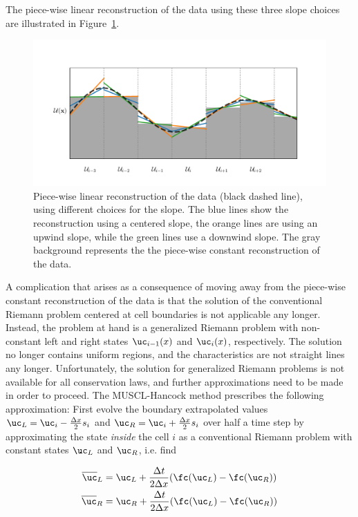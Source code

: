The piece-wise linear reconstruction of the data using these three slope choices are illustrated in
Figure~\ref{fig:piecewise-linear}.



\begin{figure}
    \centering
    \includegraphics[width=\textwidth]{figures/FV/piecewise_linear.pdf}%
    \caption[Piece-wise linear reconstruction of data]{
Piece-wise linear reconstruction of the data (black dashed line), using different choices for the
slope. The blue lines show the reconstruction using a centered slope, the orange lines are using an
upwind slope, while the green lines use a downwind slope. The gray background represents the the
piece-wise constant reconstruction of the data.
    }
    \label{fig:piecewise-linear}
\end{figure}


A complication that arises as a consequence of moving away from the piece-wise constant
reconstruction of the data is that the solution of the conventional Riemann problem centered at cell
boundaries is not applicable any longer. Instead, the problem at hand is a generalized Riemann
problem with non-constant left and right states $\uc_{i-1}(x)$ and $\uc_{i}(x)$, respectively.
The solution no longer contains uniform regions, and the characteristics are not straight lines any
longer. Unfortunately, the solution for generalized Riemann problems is not available for all
conservation laws, and further approximations need to be made in order to proceed. The
MUSCL-Hancock method prescribes the following approximation: First evolve the boundary extrapolated
values $\uc_L = \uc_i - \frac{\Delta x}{2} s_i$ and $\uc_R = \uc_i + \frac{\Delta x}{2} s_i$ over
half a time step by approximating the state \emph{inside} the cell $i$ as a conventional Riemann
problem with constant states $\uc_L$ and $\uc_R$, i.e. find

\begin{align}
    \overline{\uc}_L &= \uc_L + \frac{\Delta t}{2 \Delta x} (\fc(\uc_L) - \fc(\uc_R))
\label{eq:boundary-extrapolated-L}\\
    \overline{\uc}_R &= \uc_R + \frac{\Delta t}{2 \Delta x} (\fc(\uc_L) - \fc(\uc_R))
\label{eq:boundary-extrapolated-R}
\end{align}

